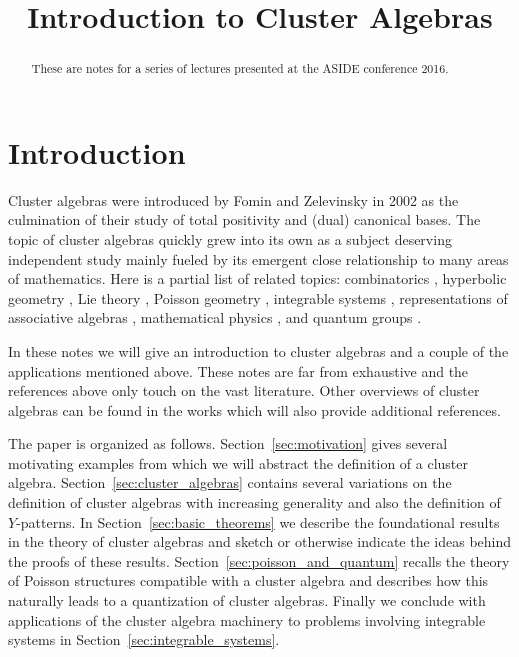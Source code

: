 \documentclass{amsart}
\title{Introduction to Cluster Algebras}
\theoremstyle{definition}
\theoremstyle{remark}
\numberwithin{equation}{section}
\begin{document}
\begin{abstract}
  These are notes for a series of lectures presented at the ASIDE conference 2016.
\end{abstract}
\maketitle

\section{Introduction}
  Cluster algebras were introduced by Fomin and Zelevinsky \cite{FZ02} in 2002 as the culmination of their study of total positivity \cite{FZ99} and (dual) canonical bases.  The topic of cluster algebras quickly grew into its own as a subject deserving independent study mainly fueled by its emergent close relationship to many areas of mathematics.  Here is a partial list of related topics: combinatorics \cite{MP07}, hyperbolic geometry \cite{FG06,FST08,MSW13}, Lie theory \cite{GLS06}, Poisson geometry \cite{GSV03}, integrable systems \cite{dFK10,G11}, representations of associative algebras \cite{CC06,CK06,BMRRT06,R11,Q12,R15}, mathematical physics \cite{EF12,ABCGPT14}, and quantum groups \cite{K12,GLS13,KQ14,BR15}.

  In these notes we will give an introduction to cluster algebras and a couple of the applications mentioned above.  These notes are far from exhaustive and the references above only touch on the vast literature.  Other overviews of cluster algebras can be found in the works \cite{K10,W13,GLS} which will also provide additional references.

  The paper is organized as follows.  Section~\ref{sec:motivation} gives several motivating examples from which we will abstract the definition of a cluster algebra.  %
	Section~\ref{sec:cluster_algebras} contains several variations on the definition of cluster algebras with increasing generality and also the definition of $Y$-patterns.  In Section~\ref{sec:basic_theorems} we describe the foundational results in the theory of cluster algebras and sketch or otherwise indicate the ideas behind the proofs of these results. Section~\ref{sec:poisson_and_quantum} recalls the theory of Poisson structures compatible with a cluster algebra and describes how this naturally leads to a quantization of cluster algebras.  Finally we conclude with applications of the cluster algebra machinery to problems involving integrable systems in Section~\ref{sec:integrable_systems}.
\end{document}
